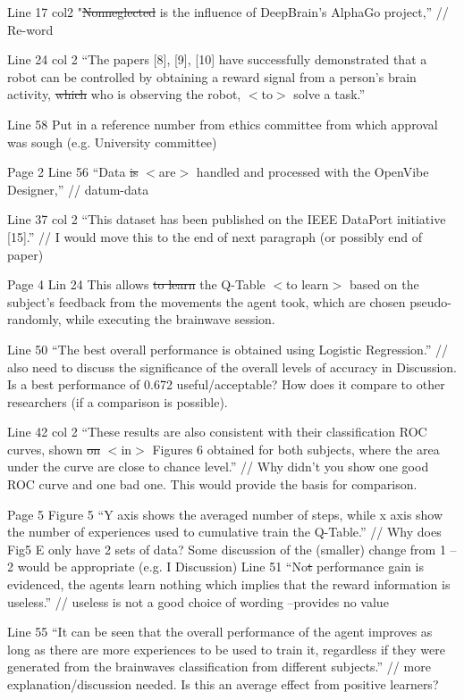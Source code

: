 \documentclass[journal,onecolumn,12pt]{IEEEtran}
\begin{document}
Line 17 col2 "\sout{Nonneglected} is the influence of DeepBrain’s AlphaGo project,” // Re-word


Line 24 col 2 “The papers [8], [9], [10] have successfully demonstrated that a robot can be controlled by obtaining a reward signal from a person’s brain activity, \sout{which} who is observing the robot, $<$to$>$ solve a task.”


Line 58 Put in a reference number from ethics committee from which approval was sough (e.g. University committee)


Page 2
Line 56 “Data \sout{is} $<$are$>$ handled and processed with the OpenVibe Designer,” // datum-data


Line 37 col 2 “This dataset has been published on the IEEE DataPort initiative [15].” // I would move this to the end of next paragraph (or possibly end of paper)


Page 4
Lin 24 This allows \sout{to learn} the Q-Table $<$to learn$>$ based on the subject’s feedback from the movements the agent
took, which are chosen pseudo-randomly, while executing the brainwave session.


Line 50 “The best overall performance is obtained using Logistic Regression.” // also need to discuss the significance of the overall levels of accuracy in Discussion. Is a best performance of 0.672 useful/acceptable? How does it compare to other researchers (if a comparison is possible).


Line 42 col 2 “These results are also consistent with their classification ROC curves, shown \sout{on} $<$in$>$ Figures 6 obtained for both subjects, where the area under the curve are close to chance level.” // Why didn’t you show one good ROC curve and one bad one. This would provide the basis for comparison.


Page 5
Figure 5 “Y axis shows the averaged number of steps, while x axis show the number of
experiences used to cumulative train the Q-Table.”
// Why does Fig5 E only have 2 sets of data? Some discussion of the (smaller) change from 1 – 2 would be appropriate (e.g. I Discussion)
Line 51 “No\sout{t} performance gain is evidenced, the agents learn nothing which implies that the reward information is useless.” // useless is not a good choice of wording –provides no value


Line 55 “It can be seen that the overall performance of the agent improves as long as there are more experiences to be used to train it, regardless if they were generated from the brainwaves classification from different subjects.” // more explanation/discussion needed. Is this an average effect from positive learners?
\end{document}
